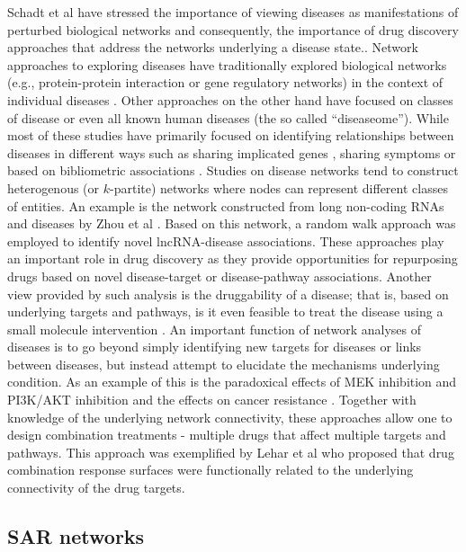 \documentclass[]{book}
\begin{document}
Schadt et al \cite{Schadt:2009zl} have stressed the importance of
viewing diseases as manifestations of perturbed biological networks
and consequently, the importance of drug discovery approaches that
address the networks underlying a disease state.. Network approaches
to exploring diseases have traditionally explored biological networks
(e.g., protein-protein interaction or gene regulatory networks) in the
context of individual diseases \cite{Lim:2006fe,
  Altieri:2008aa}. Other approaches on the other hand have focused on
classes of disease \cite{Zhang:2013tx} or even all known human
diseases \cite{Goh:2007aa} (the so called ``diseaseome''). While most
of these studies have primarily focused on identifying relationships
between diseases in different ways such as sharing implicated genes
\cite{Bauer-Mehren:2011tv,Goh:2007aa}, sharing symptoms
\cite{Zhou:2014qp} or based on bibliometric associations
\cite{Zhang:2014sh}. Studies on disease networks tend to construct
heterogenous (or $k$-partite) networks where nodes can represent
different classes of entities. An example is the network constructed
from long non-coding RNAs and diseases by Zhou et al
\cite{Zhou:2015if}. Based on this network, a random walk approach was
employed to identify novel lncRNA-disease associations. These
approaches play an important role in drug discovery as they provide
opportunities for repurposing drugs based on novel disease-target or
disease-pathway associations. Another view provided by such analysis
is the druggability of a disease; that is, based on underlying targets
and pathways, is it even feasible to treat the disease using a small
molecule intervention \cite{Boran:2010fk}. An important function of
network analyses of diseases is to go beyond simply identifying new
targets for diseases or links between diseases, but instead attempt to
elucidate the mechanisms underlying condition. As an example of this is
the paradoxical effects of MEK inhibition and PI3K/AKT inhibition and
the effects on cancer resistance \cite{Sos:2009gc}. Together with knowledge
of the underlying network connectivity, these approaches allow one to
design combination treatments - multiple drugs that affect multiple
targets and pathways. This approach was exemplified by Lehar et al
\cite{Lehar:2009gu} who proposed that drug combination response
surfaces were functionally related to the underlying connectivity of
the drug targets.


\subsection{SAR networks}
\label{sec:sar-networks}
\end{document}
